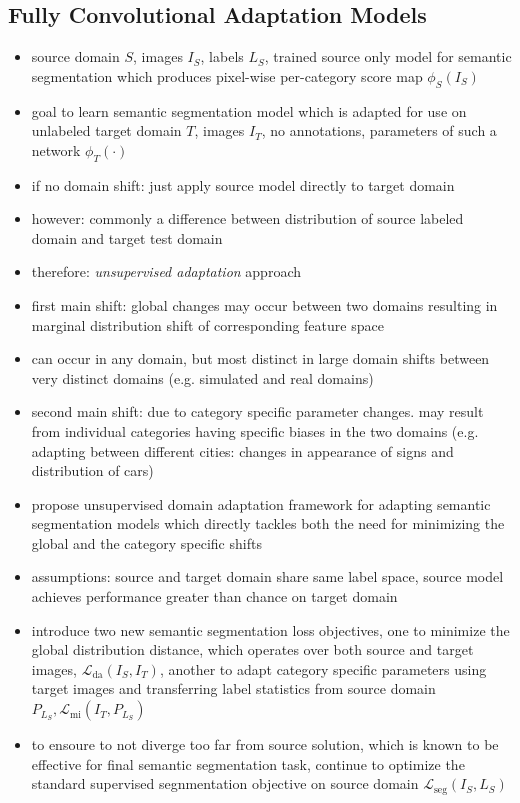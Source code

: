\documentclass[]{article}
\begin{document}
\subsection{Fully Convolutional Adaptation Models}
\begin{itemize}
	\item source domain $S$, images $I_S$, labels $L_S$, trained source only model for semantic segmentation which produces pixel-wise per-category score map $\phi_S(I_S)$
	\item goal to learn semantic segmentation model which is adapted for use on unlabeled target domain $T$, images $I_T$, no annotations, parameters of such a network $\phi_T(\cdot)$
	\item if no domain shift: just apply source model directly to target domain
	\item however: commonly a difference between distribution of source labeled domain and target test domain
	\item therefore: \textit{unsupervised adaptation} approach
	\item first main shift: global changes may occur between two domains resulting in marginal distribution shift of corresponding feature space
	\item can occur in any domain, but most distinct in large domain shifts between very distinct domains (e.g. simulated and real domains)
	\item second main shift: due to category specific parameter changes. may result from individual categories having specific biases in the two domains (e.g. adapting between different cities: changes in appearance of signs and distribution of cars)
	\item propose unsupervised domain adaptation framework for adapting semantic segmentation models which directly tackles both the need for minimizing the global and the category specific shifts
	\item assumptions: source and target domain share same label space, source model achieves performance greater than chance on target domain
	\item introduce two new semantic segmentation loss objectives, one to minimize the global distribution distance, which operates over both source and target images, $\mathcal{L}_{\text{da}}(I_S, I_T)$, another to adapt category specific parameters using target images and transferring label statistics from source domain $P_{L_S}, \mathcal{L}_{\text{mi}}(I_T,P_{L_S})$
	\item to ensoure to not diverge too far from source solution, which is known to be effective for final semantic segmentation task, continue to optimize the standard supervised segnmentation objective on source domain $\mathcal{L}_{\text{seg}}(I_S, L_S)$

\end{itemize}
\end{document}
